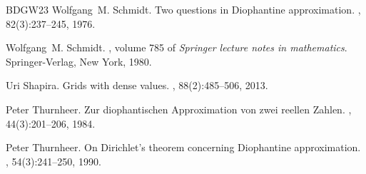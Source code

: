 \documentclass[reqno,11pt, twoside]{amsart}
\theoremstyle{plain}
\theoremstyle{definition}
\theoremstyle{definition}
\theoremstyle{remark}
\numberwithin{equation}{section}
\begin{document}
\begin{thebibliography}{BDGW23}
Wolfgang~M. Schmidt.
\newblock Two questions in {D}iophantine approximation.
, 82(3):237--245, 1976.

Wolfgang~M. Schmidt.
, volume 785 of {\em Springer lecture
  notes in mathematics}.
\newblock Springer-Verlag, New York, 1980.

Uri Shapira.
\newblock Grids with dense values.
, 88(2):485--506, 2013.

Peter Thurnheer.
\newblock Zur diophantischen {A}pproximation von zwei reellen {Z}ahlen.
, 44(3):201--206, 1984.

Peter Thurnheer.
\newblock On {D}irichlet's theorem concerning {D}iophantine approximation.
, 54(3):241--250, 1990.

\end{thebibliography}
\end{document}
